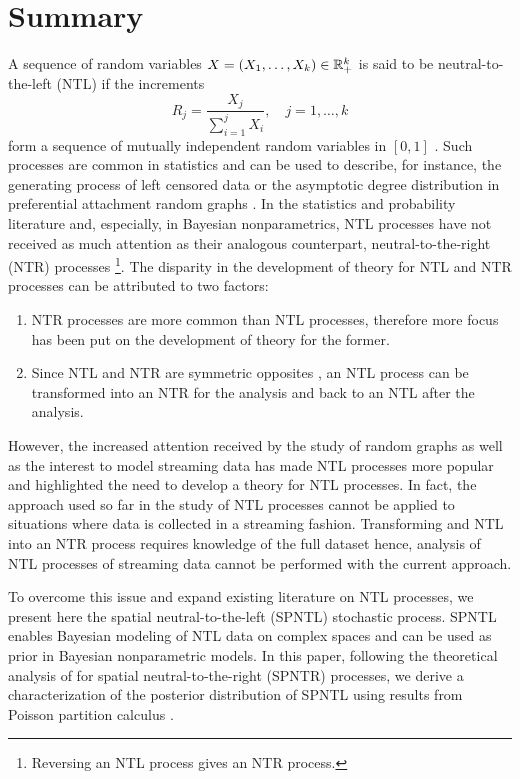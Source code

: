 

\section{Summary} \label{summary}
A sequence of random variables $X = (X_1, \ldots, X_k) \in \mathbb{R}^k_+$ is said to be neutral-to-the-left (NTL) if the increments 
\begin{equation*}
R_j = \frac{X_j}{\sum_{i=1}^j X_i}, \quad j=1, \ldots, k
\end{equation*} 
form a sequence of mutually independent random variables in $[0, 1]$ \cite{bloem2018sampling}. Such processes are common in statistics and can be used to describe, for instance, the generating process of left censored data or the asymptotic degree distribution in preferential attachment random graphs \cite{bloem2017preferential}. In the statistics and probability literature and, especially, in Bayesian nonparametrics, NTL processes have not received as much attention as their analogous counterpart, neutral-to-the-right (NTR) processes \footnote{Reversing an NTL process gives an NTR process.}. The disparity in the development of theory for NTL and NTR processes can be attributed to two factors:

\begin{enumerate}
	\item NTR processes are more common than NTL processes, therefore more focus has been put on the development of theory for the former.
	\item Since NTL and NTR are symmetric opposites \cite{bloem2018sampling}, an NTL process can be transformed into an NTR for the analysis and back to an NTL after the analysis.
\end{enumerate}

However, the increased attention received by the study of random graphs as well as the interest to model streaming data has made NTL processes more popular and highlighted the need to develop a theory for NTL processes. In fact, the approach used so far in the study of NTL processes cannot be applied to situations where data is collected in a streaming fashion. Transforming and NTL into an NTR process requires knowledge of the full dataset hence, analysis of NTL processes of streaming data cannot be performed with the current approach.

To overcome this issue and expand existing literature on NTL processes, we present here the spatial neutral-to-the-left (SPNTL) stochastic process. SPNTL enables Bayesian modeling of NTL data on complex spaces and can be used as prior in Bayesian nonparametric models. In this paper, following the theoretical analysis of \cite{james2006poisson} for spatial neutral-to-the-right (SPNTR) processes, we derive a characterization of the posterior distribution of SPNTL using results from Poisson partition calculus \cite{james2005poisson}.


